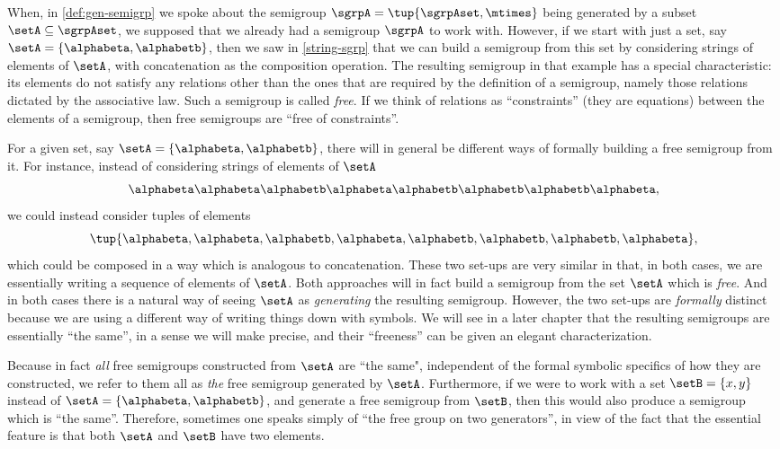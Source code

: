 When, in \cref{def:gen-semigrp} we spoke about the semigroup $\sgrpA = \tup{\sgrpAset, \mtimes}$  being generated by a subset $\setA \subseteq \sgrpAset$, we supposed that we already had a semigroup $\sgrpA$ to work with. However, if we start with just a set, say $\setA = \{ \alphabeta, \alphabetb\}$, then we saw in \cref{string-sgrp} that we can build a semigroup from this set by considering strings of elements of $\setA$, with concatenation as the composition operation. The resulting semigroup in that example has a special characteristic: its elements do not satisfy any relations other than the ones that are required by the definition of a semigroup, namely those relations dictated by the associative law. Such a semigroup is called \emph{free}. If we think of relations as ``constraints'' (they are equations) between the elements of a semigroup, then free semigroups are ``free of constraints''.

For a given set, say $\setA = \{ \alphabeta, \alphabetb\}$, there will in general be different ways of formally building a free semigroup from it. For instance, instead of considering strings of elements of $\setA$
\begin{equation}
  \alphabeta\alphabeta \alphabetb \alphabeta \alphabetb \alphabetb \alphabetb \alphabeta,
\end{equation}
we could instead consider tuples of elements
\begin{equation}
  \tup{ \alphabeta, \alphabeta,  \alphabetb,  \alphabeta,  \alphabetb,  \alphabetb,  \alphabetb,  \alphabeta},
\end{equation}
which could be composed in a way which is analogous to concatenation. These two set-ups are very similar in that, in both cases, we are essentially writing a sequence of elements of $\setA$. Both approaches will in fact build a semigroup from the set $\setA$ which is \emph{free}. And in both cases there is a natural way of seeing $\setA$ as \emph{generating} the resulting semigroup. However, the two set-ups are \emph{formally} distinct because we are using a different way of writing things down with symbols. We will see in a later chapter that the resulting semigroups are essentially ``the same'', in a sense we will make precise, and their ``freeness'' can be given an elegant characterization.

Because in fact \emph{all} free semigroups constructed from $\setA$ are ``the same", independent of the formal symbolic specifics of how they are constructed, we refer to them all as \emph{the} free semigroup generated by $\setA$. Furthermore, if we were to work with a set $\setB = \{ x, y \}$ instead of $\setA = \{ \alphabeta, \alphabetb\}$, and generate a free semigroup from $\setB$, then this would also produce a semigroup which is ``the same''. Therefore, sometimes one speaks simply of ``the free group on two generators'', in view of the fact that the essential feature is that both $\setA$ and $\setB$ have two elements.

